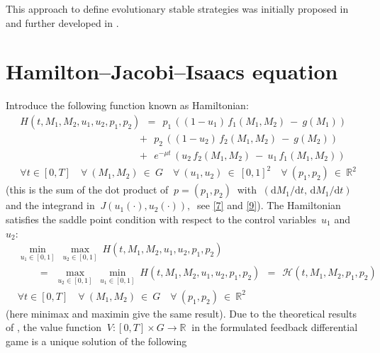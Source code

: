 \documentclass[a4paper,12pt]{article}
\begin{document}
This approach to define evolutionary stable strategies was initially proposed in \cite{BernhardGrognardMailleretAkhmetzhanov2010}
and further developed in \cite{YegorovGrognardMailleretHalkettBernhard2019}.


\section{Hamilton--Jacobi--Isaacs equation}

Introduce the following function known as Hamiltonian:
\begin{equation}
\begin{aligned}
& H(t, M_1, M_2, u_1, u_2, p_1, p_2) \:\: = \:\:
p_1 \, ((1 - u_1) \, f_1(M_1, M_2) \: - \: g(M_1)) \\
& \qquad\qquad\qquad\qquad\qquad\quad \:\:\:\,
+ \:\: p_2 \, ((1 - u_2) \, f_2(M_1, M_2) \: - \: g(M_2)) \\
& \qquad\qquad\qquad\qquad\qquad\quad \:\:\:\,
+ \:\: e^{-\mu t} \, (u_2 \, f_2(M_1, M_2) \: - \: u_1 \, f_1(M_1, M_2)) \\
& \forall t \in [0, T] \quad \forall \: (M_1, M_2) \: \in \: G \quad \forall \: (u_1, u_2) \: \in \: [0, 1]^2 \quad
\forall \: (p_1, p_2) \: \in \: \mathbb{R}^2
\end{aligned}  \label{12}
\end{equation}
(this is the sum of the dot product of $ \: p = (p_1, p_2) \: $ with
$ \: (\mathrm{d} M_1 / \mathrm{d} t, \, \mathrm{d} M_1 / \mathrm{d} t) \: $ and the integrand in $ \: J(u_1(\cdot), u_2(\cdot)), \: $
see \cref{7} and \cref{9}). The Hamiltonian satisfies the saddle point condition with respect to the control variables~$ u_1 $ and
$ u_2 $:
\begin{equation}
\begin{aligned}
& \min_{u_1 \in [0, 1]} \: \max_{u_2 \in [0, 1]} \: H(t, M_1, M_2, u_1, u_2, p_1, p_2) \\
& \qquad
= \:\: \max_{u_2 \in [0, 1]} \: \min_{u_1 \in [0, 1]} \: H(t, M_1, M_2, u_1, u_2, p_1, p_2) \:\:
= \:\: \mathcal{H} (t, M_1, M_2, p_1, p_2) \\
& \forall t \in [0, T] \quad \forall \: (M_1, M_2) \: \in \: G \quad \forall \: (p_1, p_2) \: \in \: \mathbb{R}^2
\end{aligned}  \label{13}
\end{equation}
(here minimax and maximin give the same result). Due to the theoretical results of \cite[\S XI.6]{FlemingSoner2006}, the value function
$ \: V \colon [0, T] \times G \to \mathbb{R} \: $ in the formulated feedback differential game is a unique solution of the following
\end{document}
